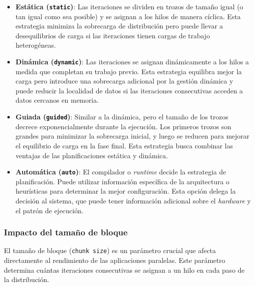             \begin{itemize}
            
                \item \textbf{Estática (\texttt{static})}: Las iteraciones se dividen en trozos de tamaño igual (o tan igual como sea posible) y se asignan a los hilos de manera cíclica. Esta estrategia minimiza la sobrecarga de distribución pero puede llevar a desequilibrios de carga si las iteraciones tienen cargas de trabajo heterogéneas.
                
                \item \textbf{Dinámica (\texttt{dynamic})}: Las iteraciones se asignan dinámicamente a los hilos a medida que completan su trabajo previo. Esta estrategia equilibra mejor la carga pero introduce una sobrecarga adicional por la gestión dinámica y puede reducir la localidad de datos si las iteraciones consecutivas acceden a datos cercanos en memoria.
                
                \item \textbf{Guiada (\texttt{guided})}: Similar a la dinámica, pero el tamaño de los trozos decrece exponencialmente durante la ejecución. Los primeros trozos son grandes para minimizar la sobrecarga inicial, y luego se reducen para mejorar el equilibrio de carga en la fase final. Esta estrategia busca combinar las ventajas de las planificaciones estática y dinámica.
                
                \item \textbf{Automática (\texttt{auto})}: El compilador o \textit{runtime} decide la estrategia de planificación. Puede utilizar información específica de la arquitectura o heurísticas para determinar la mejor configuración. Esta opción delega la decisión al sistema, que puede tener información adicional sobre el \textit{hardware} y el patrón de ejecución.
            
            \end{itemize}

            \subsubsection{Impacto del tamaño de bloque}
            
                El tamaño de bloque (\texttt{chunk size}) es un parámetro crucial que afecta directamente al rendimiento de las aplicaciones paralelas. Este parámetro determina cuántas iteraciones consecutivas se asignan a un hilo en cada paso de la distribución.
                

